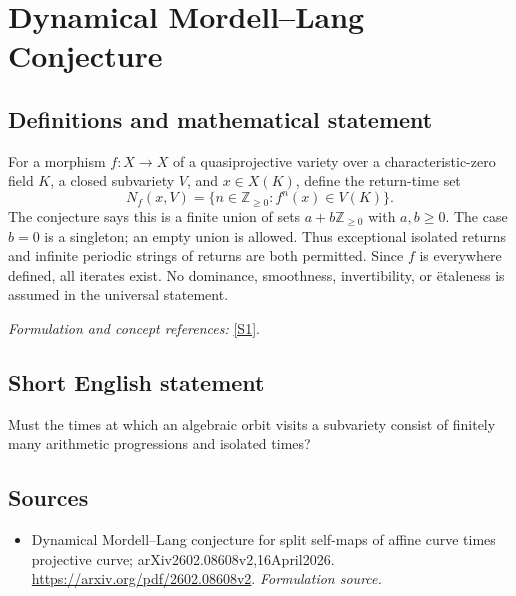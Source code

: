 \documentclass[11pt]{article}
\begin{document}
\section*{\texorpdfstring{Dynamical Mordell–Lang Conjecture}{Dynamical Mordell–Lang Conjecture}}\label{30006813}
\subsection{Definitions and mathematical statement}
For a morphism $f:X\to X$ of a quasiprojective variety over a characteristic-zero field $K$, a closed subvariety $V$, and $x\in X(K)$, define the return-time set
\[
 N_f(x,V)=\{n\in{\mathbb{Z}}_{\ge0}:f^n(x)\in V(K)\}.
\]
The conjecture says this is a finite union of sets $a+b{\mathbb{Z}}_{\ge0}$ with $a,b\ge0$. The case $b=0$ is a singleton; an empty union is allowed. Thus exceptional isolated returns and infinite periodic strings of returns are both permitted. Since $f$ is everywhere defined, all iterates exist. No dominance, smoothness, invertibility, or \"etaleness is assumed in the universal statement.
\par\smallskip\textit{Formulation and concept references:} \href{https://arxiv.org/pdf/2602.08608v2}{[S1]}.

\subsection{Short English statement}
Must the times at which an algebraic orbit visits a subvariety consist of finitely many arithmetic progressions and isolated times?
\subsection{Sources}
\begin{itemize}
\item[S1]Dynamical Mordell–Lang conjecture for split self-maps of affine curve times projective curve; arXiv2602.08608v2,16April2026.
\url{https://arxiv.org/pdf/2602.08608v2}.
\textit{Formulation source.}
\end{itemize}
\end{document}
